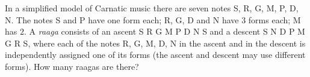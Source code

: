 In a simplified model of Carnatic music there are seven notes S, R, G, M, P, D, N. The notes S and P have one form each; R, G, D and N have $3$ forms each; M has $2$. A \emph{raaga} consists of an ascent S R G M P D N S and a descent S N D P M G R S, where each of the notes R, G, M, D, N in the ascent and in the descent is independently assigned one of its forms (the ascent and descent may use different forms). How many raagas are there?
